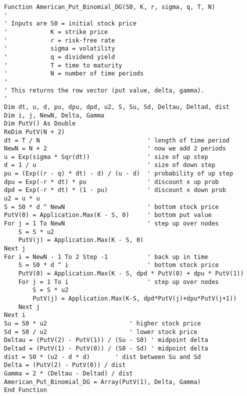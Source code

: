 \small\begin{verbatim}
Function American_Put_Binomial_DG(S0, K, r, sigma, q, T, N)
'
' Inputs are S0 = initial stock price
'            K = strike price
'            r = risk-free rate
'            sigma = volatility
'            q = dividend yield
'            T = time to maturity
'            N = number of time periods
'
' This returns the row vector (put value, delta, gamma).
'
Dim dt, u, d, pu, dpu, dpd, u2, S, Su, Sd, Deltau, Deltad, dist
Dim i, j, NewN, Delta, Gamma
Dim PutV() As Double
ReDim PutV(N + 2)
dt = T / N                              ' length of time period
NewN = N + 2                            ' now we add 2 periods
u = Exp(sigma * Sqr(dt))                ' size of up step
d = 1 / u                               ' size of down step
pu = (Exp((r - q) * dt) - d) / (u - d)  ' probability of up step
dpu = Exp(-r * dt) * pu                 ' discount x up prob
dpd = Exp(-r * dt) * (1 - pu)           ' discount x down prob
u2 = u * u
S = S0 * d ^ NewN                       ' bottom stock price
PutV(0) = Application.Max(K - S, 0)     ' bottom put value
For j = 1 To NewN                       ' step up over nodes
    S = S * u2
    PutV(j) = Application.Max(K - S, 0)
Next j
For i = NewN - 1 To 2 Step -1           ' back up in time
    S = S0 * d ^ i                      ' bottom stock price
    PutV(0) = Application.Max(K - S, dpd * PutV(0) + dpu * PutV(1))
    For j = 1 To i                      ' step up over nodes
        S = S * u2
        PutV(j) = Application.Max(K-S, dpd*PutV(j)+dpu*PutV(j+1))
    Next j
Next i                             
Su = S0 * u2                       ' higher stock price  
Sd = S0 / u2                       ' lower stock price 
Deltau = (PutV(2) - PutV(1)) / (Su - S0) ' midpoint delta
Deltad = (PutV(1) - PutV(0)) / (S0 - Sd) ' midpoint delta
dist = S0 * (u2 - d * d)       ' dist between Su and Sd
Delta = (PutV(2) - PutV(0)) / dist
Gamma = 2 * (Deltau - Deltad) / dist
American_Put_Binomial_DG = Array(PutV(1), Delta, Gamma)
End Function
\end{verbatim}\normalsize

